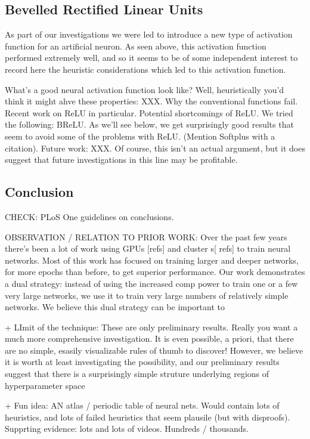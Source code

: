 \documentclass[10pt]{article}
\begin{document}
\subsection*{Bevelled Rectified Linear Units}

As part of our investigations we were led to introduce a new type of
activation function for an artificial neuron.  As seen above, this
activation function performed extremely well, and so it seems to be of
some independent interest to record here the heuristic considerations
which led to this activation function.

What's a good neural activation function look like?  Well,
heuristically you'd think it might ahve these properties: XXX.  Why
the conventional functions fail.  Recent work on ReLU in particular.
Potential shortcomings of ReLU.  We tried the following: BReLU.  As
we'll see below, we get surprisingly good results that seem to avoid
some of the problems with ReLU. (Mention Softplus with a citation).
Future work: XXX.  Of course, this isn't an actual argument, but it
does suggest that future investigations in this line may be
profitable.

\subsection*{Conclusion}

CHECK: PLoS One guidelines on conclusions.

OBSERVATION / RELATION TO PRIOR WORK: Over the past few years there's
been a lot of work using GPUs [refs] and cluster s[ refs] to train
neural networks.  Most of this work has focused on training larger and
deeper networks, for more epochs than before, to get superior
performance.  Our work demonstrates a dual strategy: instead of using
the increased comp power to train one or a few very large networks, we
use it to train very large numbers of relatively simple networks.  We
believe this dual strategy can be important to

+ LImit of the technique: These are only preliminary results.  Really
you want a much more comprehensive investigation.  It is even
possible, a priori, that there are no simple, esasily visualizable
rules of thumb to discover!  However, we believe it is worth at least
investigating the possibility, and our preliminary results suggest
that there is a surprisingly simple struture underlying regions of
hyperparameter space

+ Fun idea: AN atlas / periodic table of neural nets.  Would contain
lots of heuristics, and lots of failed heuristics that seem plausile
(but with disproofs).  Supprting evidence: lots and lots of videos.
Hundreds / thousands.
\end{document}
